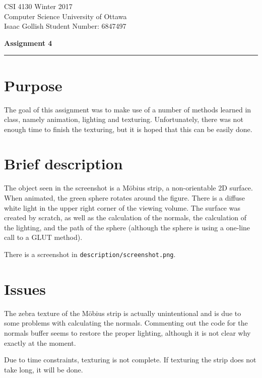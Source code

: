 \documentclass[11pt, letterpaper]{article}
\begin{document}
CSI 4130 \hfill Winter 2017 \\
Computer Science \hfill University of Ottawa \\
Isaac Gollish \hfill Student Number: 6847497
\begin{center}
    \textbf{Assignment 4} \\
\end{center}

\hrule

\section*{Purpose}
The goal of this assignment was to make use of a number of methods learned in
class, namely animation, lighting and texturing. Unfortunately, there was not
enough time to finish the texturing, but it is hoped that this can be easily
done.


\section*{Brief description}

The object seen in the screenshot is a M\"{o}bius strip, a non-orientable 2D
surface. When animated, the green sphere rotates around the figure. There is a
diffuse white light in the upper right corner of the viewing volume. The surface
was created by scratch, as well as the calculation of the normals, the
calculation of the lighting, and the path of the sphere (although the sphere is
using a one-line call to a GLUT method).

There is a screenshot in \texttt{description/screenshot.png}.

\section*{Issues}

The zebra texture of the Möbius strip is actually unintentional and is due to
some problems with calculating the normals. Commenting out the code for the
normals buffer seems to restore the proper lighting, although it is not clear why
exactly at the moment.

Due to time constraints, texturing is not complete. If texturing the strip does
not take long, it will be done.
\end{document}
